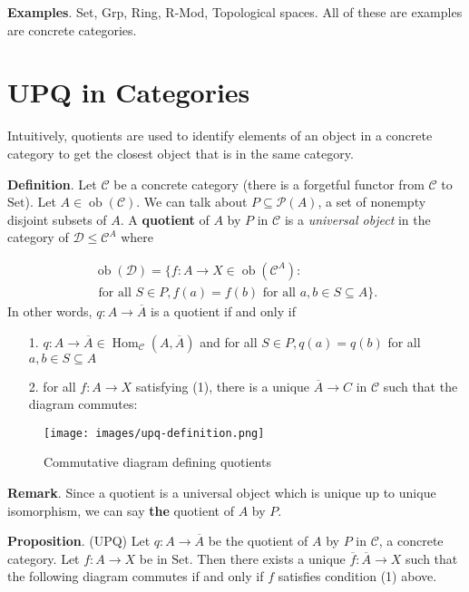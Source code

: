 \documentclass{article}
\begin{document}
\textbf{Examples}. Set, Grp, Ring, R-Mod, Topological spaces. All of these are examples are concrete categories.

\chapter{UPQ in Categories}

Intuitively, quotients are used to identify elements of an object in a concrete category to get the {\textquotedbl}closest{\textquotedbl} object that is in the same category.

\textbf{Definition}. Let \(\mathcal{C}\) be a concrete category (there is a forgetful functor from \(\mathcal{C}\) to \(\mathrm{Set}\)).  Let \(A \in \operatorname{ob}(\mathcal{C})\). We can talk about \(P \subseteq \mathcal{P}(A)\), a set of nonempty disjoint subsets of \(A\). A \textbf{quotient} of \(A\) by \(P\) in \(\mathcal{C}\) is a \emph{universal object} in the category of \(\mathcal{D} \leq \mathcal{C}^{A}\) where

\begin{equation*}
\begin{split}\operatorname{ob}(\mathcal{D}) = \{ f : A \to X \in \operatorname{ob}(\mathcal{C}^A) : \\
\text{ for all } S \in P, f(a) = f(b) \text{ for all } a,b \in S \subseteq A\}.\end{split}\end{equation*}
In other words, \(q : A \to \overline{A}\) is a quotient if and only if

\begin{itemize}
\item[1. ] \(q : A \to \overline{A} \in \operatorname{Hom}_{\mathcal{C}}(A,\overline{A})\) and for all \(S \in P, q(a) = q(b)\) for all \(a,b \in S \subseteq A\)
\item[2. ] for all \(f : A \to X\) satisfying (1), there is a unique \(\overline{A} \to C\) in \(\mathcal{C}\) such that the diagram commutes:

\end{itemize}
\begin{figure}
\centering
\texttt{[image: images/upq-definition.png]}
\caption{Commutative diagram defining quotients}
\end{figure}


\textbf{Remark}. Since a quotient is a universal object which is unique up to unique isomorphism, we can say \textbf{the} quotient of \(A\) by \(P\).

\textbf{Proposition}. (UPQ) Let \(q : A \to \overline{A}\) be the quotient of \(A\) by \(P\) in \(\mathcal{C}\), a concrete category. Let \(f : A \to X\) be in \(\mathrm{Set}\). Then there exists a unique \(\overline{f} : \overline{A} \to X\) such that the following diagram commutes if and only if \(f\) satisfies condition (1) above.
\end{document}
